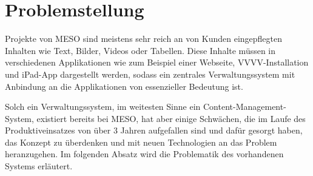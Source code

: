 \section{Problemstellung}
\label{sec:e_problemstellung}

Projekte von MESO sind meistens sehr reich an von Kunden eingepflegten Inhalten
wie Text, Bilder, Videos oder Tabellen.  Diese Inhalte müssen in verschiedenen
Applikationen wie zum Beispiel einer Webseite, VVVV-Installation und iPad-App
dargestellt werden, sodass ein zentrales Verwaltungssystem mit Anbindung an die
Applikationen von essenzieller Bedeutung ist.

Solch ein Verwaltungssystem, im weitesten Sinne ein Content-Management-System,
existiert bereits bei MESO, hat aber einige Schwächen, die im Laufe des
Produktiveinsatzes von über 3 Jahren aufgefallen sind und dafür gesorgt haben,
das Konzept zu überdenken und mit neuen Technologien an das Problem
heranzugehen.  Im folgenden Absatz wird die Problematik des vorhandenen Systems
erläutert.


